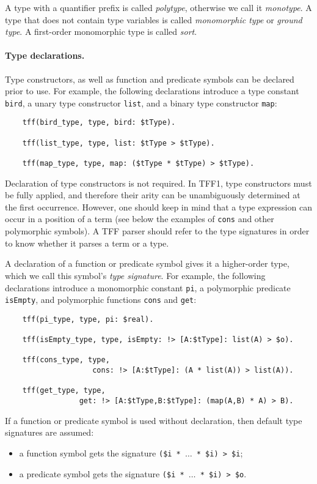 A type with a quantifier prefix is called {\em polytype},
otherwise we call it {\em monotype}.
A type that does not contain type variables is called
{\em monomorphic type\/} or {\em ground type}.
A first-order monomorphic type is called {\em sort}.

\paragraph{Type declarations.} Type constructors, as well as
function and predicate symbols can be declared prior to use.
For example, the following declarations introduce a type
constant {\tt bird}, a unary type constructor {\tt list},
and a binary type constructor {\tt map}:
\begin{verbatim}
    tff(bird_type, type, bird: $tType).

    tff(list_type, type, list: $tType > $tType).

    tff(map_type, type, map: ($tType * $tType) > $tType).
\end{verbatim}
Declaration of type constructors is not required. In TFF1,
type constructors must be fully applied, and therefore
their arity can be unambiguously determined at the first
occurrence. However, one should keep in mind that a type
expression can occur in a position of a term (see below
the examples of {\tt cons} and other polymorphic symbols).
A TFF parser should refer to the type signatures in order
to know whether it parses a term or a type.

A declaration of a function or predicate symbol gives it
a higher-order type, which we call this symbol's
{\em type signature}. For example, the following
declarations introduce a monomorphic constant {\tt pi},
a polymorphic predicate {\tt isEmpty}, and polymorphic
functions {\tt cons} and {\tt get}:
\begin{verbatim}
    tff(pi_type, type, pi: $real).

    tff(isEmpty_type, type, isEmpty: !> [A:$tType]: list(A) > $o).

    tff(cons_type, type,
                    cons: !> [A:$tType]: (A * list(A)) > list(A)).

    tff(get_type, type,
                 get: !> [A:$tType,B:$tType]: (map(A,B) * A) > B).
\end{verbatim}
If a function or predicate symbol is used without declaration,
then default type signatures are assumed:
\begin{itemize}
\item a function symbol gets the signature
{\tt (\$i * $\dots$ * \$i) > \$i};
\item a predicate symbol gets the signature
{\tt (\$i * $\dots$ * \$i) > \$o}.
\end{itemize}

